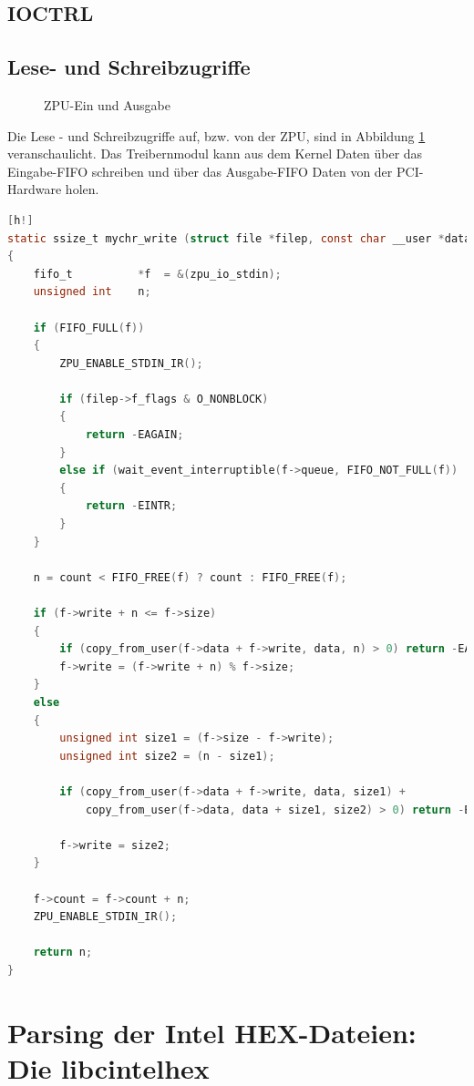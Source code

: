 \documentclass[11pt]{scrartcl}
\begin{document}
\subsection{IOCTRL}


\subsection{Lese- und Schreibzugriffe}

\begin{figure}[H]
	\begin{center}
		
		\caption{ZPU-Ein und Ausgabe}
		\label{zpu_io}
	\end{center}
\end{figure}

Die Lese - und Schreibzugriffe auf, bzw. von der ZPU, sind in Abbildung \ref{zpu_io} veranschaulicht. Das Treibernmodul kann aus dem Kernel Daten über das Eingabe-FIFO schreiben und über das Ausgabe-FIFO Daten von der PCI-Hardware holen.

\begin{lstlisting}[language=C, firstnumber=14, label=modzpu_mychr_write, caption=ZPU-Schreib-Funktion][h!]
static ssize_t mychr_write (struct file *filep, const char __user *data, size_t count, loff_t *offset)
{
	fifo_t			*f	= &(zpu_io_stdin);
	unsigned int	n;
	
	if (FIFO_FULL(f))
	{
		ZPU_ENABLE_STDIN_IR();
	
		if (filep->f_flags & O_NONBLOCK)
		{
			return -EAGAIN;
		}
		else if (wait_event_interruptible(f->queue, FIFO_NOT_FULL(f)) != 0)
		{
			return -EINTR;
		}
	}
	
	n = count < FIFO_FREE(f) ? count : FIFO_FREE(f);
	
	if (f->write + n <= f->size)
	{
		if (copy_from_user(f->data + f->write, data, n) > 0) return -EAGAIN;
		f->write = (f->write + n) % f->size;
	}
	else
	{
		unsigned int size1 = (f->size - f->write);
		unsigned int size2 = (n - size1);
		
		if (copy_from_user(f->data + f->write, data, size1) +
		    copy_from_user(f->data, data + size1, size2) > 0) return -EAGAIN;
		
		f->write = size2;
	}
	
	f->count = f->count + n;
	ZPU_ENABLE_STDIN_IR();
	
	return n;
}
\end{lstlisting}


\pagebreak
\section{Parsing der Intel HEX-Dateien: Die libcintelhex}
\label{chapter_libcintelhex}
\end{document}
